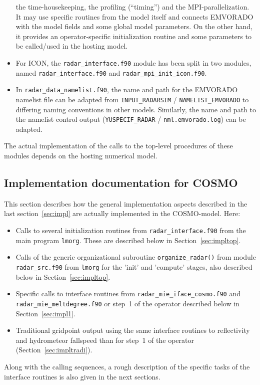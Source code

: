 \documentclass[10pt,a4paper,twoside,headinclude,footinclude,parskip=half]{scrartcl}
\newcommand{\myaktuellesection}{sec:intro}%
\newcommand{\labelsec}[1]{\label{#1}\renewcommand{\myaktuellesection}{#1}}%
\newcommand{\labelsec}[1]{\label{#1}}%
\newcommand{\srcform}[1]{\mbox{\texttt{#1}}\xspace}%
\begin{document}
\begin{itemize}
  the time-housekeeping, the profiling (``timing'') and the MPI-parallelization.
  It may use specific routines from the model itself and connects EMVORADO with the model fields and some global model parameters.
  On the other hand, it provides an operator-specific initialization routine and some parameters to be called/used
  in the hosting model.
\item For ICON, the \srcform{radar_interface.f90} module has been split in two modules, named \srcform{radar_interface.f90} and \srcform{radar_mpi_init_icon.f90}.
\item In \srcform{radar_data_namelist.f90}, the name and path for the EMVORADO namelist file can be adapted from \srcform{INPUT_RADARSIM} / \srcform{NAMELIST_EMVORADO} to
  differing naming conventions in other models. Similarly, the name and path to the namelist control output (\srcform{YUSPECIF_RADAR} / \srcform{nml.emvorado.log}) can be adapted.
\end{itemize}
The actual implementation of the calls to the top-level procedures of these modules depends on the hosting numerical model.


\newpage

\subsection{Implementation documentation for COSMO}

\labelsec{sec:implcosmo}

This section describes how the general implementation aspects described in the last section~\ref{sec:impl}
are actually implemented in the COSMO-model. Here:
\begin{itemize}
\item Calls to several initialization routines from \srcform{radar_interface.f90} from
  the main program \srcform{lmorg}. These are described below in Section~\ref{sec:impltop}.
\item Calls of the generic organizational subroutine \srcform{organize_radar()} from module \srcform{radar_src.f90}
  from \srcform{lmorg} for the 'init' and 'compute' stages, also described below in Section~\ref{sec:impltop}.
\item Specific calls to interface routines from \srcform{radar_mie_iface_cosmo.f90} and \srcform{radar_mie_meltdegree.f90} or step~1 of the operator described below in Section~\ref{sec:impl1}.
\item Traditional gridpoint output using the same interface routines to reflectivity and hydrometeor
  fallspeed than for step~1 of the operator (Section~\ref{sec:impltradi}).
\end{itemize}
Along with the calling sequences, a rough description of the specific tasks of
the interface routines is also given in the next sections.
\end{document}
